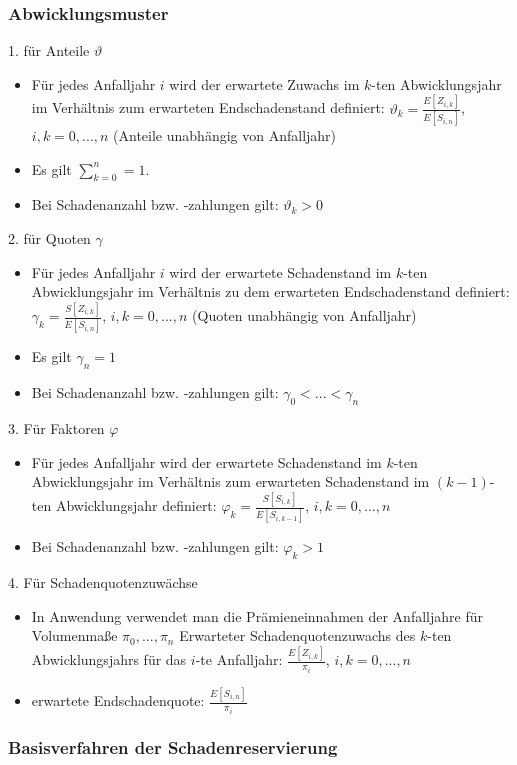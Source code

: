 \documentclass[12pt]{report}
\theoremstyle{dotless}
\theoremstyle{definition}
\begin{document}
\subsubsection{Abwicklungsmuster}

1. für Anteile $\vartheta$
\begin{itemize}
\item Für jedes Anfalljahr $i$ wird der erwartete Zuwachs im $k$-ten Abwicklungsjahr im Verhältnis zum erwarteten Endschadenstand definiert: $\vartheta_k = \frac{E[Z_{i,k}]}{E[S_{i,n}]}$, $i,k=0,...,n$ (Anteile unabhängig von Anfalljahr)
\item Es gilt $\sum_{k=0}^n =1$.
\item Bei Schadenanzahl bzw. -zahlungen gilt: $\vartheta_k >0$
\end{itemize}
2. für Quoten $\gamma$
\begin{itemize}
\item Für jedes Anfalljahr $i$ wird der erwartete Schadenstand im $k$-ten Abwicklungsjahr im Verhältnis zu dem erwarteten Endschadenstand definiert: $\gamma_k = \frac{S[Z_{i,k}]}{E[S_{i,n}]}$, $i,k=0,...,n$ (Quoten unabhängig von Anfalljahr)
\item Es gilt $\gamma_n=1$
\item Bei Schadenanzahl bzw. -zahlungen gilt: $\gamma_0 < ... < \gamma_n$
\end{itemize}
3. Für Faktoren $\varphi$
\begin{itemize}
\item Für jedes Anfalljahr wird der erwartete Schadenstand im $k$-ten Abwicklungsjahr im Verhältnis zum erwarteten Schadenstand im $(k-1)$-ten Abwicklungsjahr definiert: $\varphi_k = \frac{S[S_{i,k}]}{E[S_{i,k-1}]}$, $i,k=0,...,n$
\item Bei Schadenanzahl bzw. -zahlungen gilt: $\varphi_k >1$
\end{itemize}
4. Für Schadenquotenzuwächse
\begin{itemize}
\item In Anwendung verwendet man die Prämieneinnahmen der Anfalljahre für Volumenmaße $\pi_0,..., \pi_n$
Erwarteter Schadenquotenzuwachs des $k$-ten Abwicklungsjahrs für das $i$-te Anfalljahr: $\frac{E[Z_{i,k}]}{\pi_i}$, $i,k=0,...,n$
\item erwartete Endschadenquote: $\frac{E[S_{i,n}]}{\pi_i}$
\end{itemize}



\subsubsection{Basisverfahren der Schadenreservierung}
\end{document}
